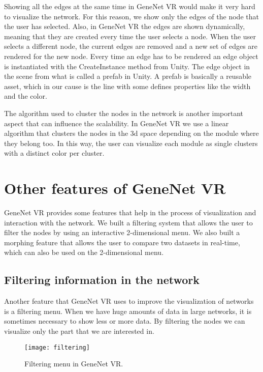 Showing all the edges at the same time in GeneNet VR would make it very hard to visualize the network. For this reason, we show only the edges of the node that the user has selected. Also, in GeneNet VR the edges are shown dynamically, meaning that they are created every time the user selects a node. When the user selects a different node, the current edges are removed and a new set of edges are rendered for the new node. Every time an edge has to be rendered an edge object is instantiated with the CreateInstance method from Unity. The edge object in the scene from what is called a prefab in Unity. A prefab \cite{prefab} is basically a reusable asset, which in our cause is the line with some defines properties like the width and the color.

The algorithm used to cluster the nodes in the network is another important aspect that can influence the scalability. In GeneNet VR we use a linear algorithm that clusters the nodes in the 3d space depending on the module where they belong too. In this way, the user can visualize each module as single clusters with a distinct color per cluster.

\section{Other features of GeneNet VR}
GeneNet VR provides some features that help in the process of visualization and interaction with the network. We built a filtering system that allows the user to filter the nodes by using an interactive 2-dimensional menu. We also built a morphing feature that allows the user to compare two datasets in real-time, which can also be used on the 2-dimensional menu.

\subsection{Filtering information in the network}
Another feature that GeneNet VR uses to improve the visualization of networks is a filtering menu. When we have huge amounts of data in large networks, it is sometimes necessary to show less or more data. By filtering the nodes we can visualize only the part that we are interested in.

\begin{figure}[h!]
    \centering%
    \texttt{[image: filtering]}
    \caption{Filtering menu in GeneNet VR.}
    \label{fig:filtering}
\end{figure}%

